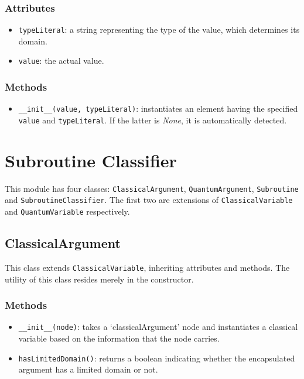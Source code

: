 \documentclass[12pt,a4paper]{report}
\theoremstyle{definition}
\theoremstyle{definition}
\theoremstyle{definition}
\begin{document}
\subsubsection{Attributes}
\begin{itemize}
    \itemsep 0em
    \item \texttt{typeLiteral}: a string representing the type of the value, which determines its domain.
    \item \texttt{value}: the actual value.
\end{itemize}
\subsubsection{Methods}
\begin{itemize}
    \itemsep 0em
    \item \texttt{\_\_init\_\_(value, typeLiteral)}: instantiates an element having the specified \texttt{value} and \texttt{typeLiteral}. If the latter is \textit{None}, it is automatically detected.
\end{itemize}

\pagebreak

\section{Subroutine Classifier}
This module has four classes: \texttt{ClassicalArgument}, \texttt{QuantumArgument}, \texttt{Subroutine} and \texttt{SubroutineClassifier}. The first two are extensions of \texttt{ClassicalVariable} and \texttt{QuantumVariable} respectively.
\subsection{ClassicalArgument}
This class extends \texttt{ClassicalVariable}, inheriting attributes and methods.
The utility of this class resides merely in the constructor.
\subsubsection{Methods}
\begin{itemize}
    \itemsep 0em
    \item \texttt{\_\_init\_\_(node)}: takes a `classicalArgument' node and instantiates a classical variable based on the information that the node carries.
    \item \texttt{hasLimitedDomain()}: returns a boolean indicating whether the encapsulated argument has a limited domain or not.
\end{itemize}
\end{document}
